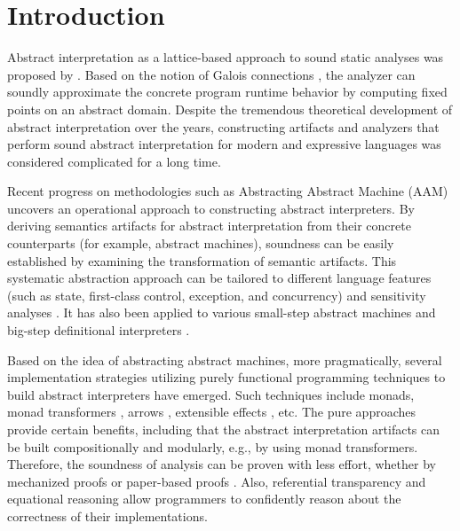 \section{Introduction} \label{intro}

Abstract interpretation as a lattice-based approach to sound static analyses was
proposed by \citet{DBLP:conf/popl/CousotC77}. Based on the notion of Galois
connections \cite{CousotCousot79-1}, the analyzer can soundly approximate the
concrete program runtime behavior by computing fixed points on an abstract
domain. Despite the tremendous theoretical development of abstract
interpretation over the years, constructing artifacts and analyzers that perform
sound abstract interpretation for modern and expressive languages was considered
complicated for a long time.

Recent progress on methodologies such as Abstracting Abstract Machine (AAM)
\cite{DBLP:journals/jfp/HornM12, DBLP:conf/icfp/HornM10} uncovers an
operational approach to constructing abstract interpreters.  By deriving
semantics artifacts for abstract interpretation from their concrete
counterparts (for example, abstract machines), soundness can be easily
established by examining the transformation of semantic artifacts.
This systematic abstraction approach can be tailored to different
language features (such as state, first-class control, exception, and
concurrency) and sensitivity analyses \cite{DBLP:conf/icfp/Gilray0M16,
  DBLP:conf/popl/GilrayL0MH16, Darais:2015:GTM:2814270.2814308}. It
has also been applied to various small-step abstract machines
\cite{DBLP:journals/jfp/HornM12, DBLP:conf/icfp/HornM10,
  Sergey:2013:MAI:2491956.2491979} and big-step definitional
interpreters \cite{Wei:2018:RAA:3243631.3236800,
  DBLP:journals/pacmpl/DaraisLNH17, Keidel:2018:CSP:3243631.3236767}.

Based on the idea of abstracting abstract machines, more
pragmatically, several implementation strategies utilizing purely
functional programming techniques to build abstract interpreters have
emerged. Such techniques include monads, monad transformers
\cite{DBLP:journals/pacmpl/DaraisLNH17,
  Sergey:2013:MAI:2491956.2491979}, arrows
\cite{Keidel:2018:CSP:3243631.3236767}, extensible effects
\cite{Kiselyov:2015:FMM:2804302.2804319, Githubsemantic}, etc. The pure
approaches provide certain benefits, including that the abstract interpretation
artifacts can be built compositionally and modularly, e.g., by using monad
transformers. Therefore, the soundness of analysis can be proven with less
effort, whether by mechanized proofs \cite{Darais:2016:CGC:2951913.2951934} or
paper-based proofs \cite{Keidel:2018:CSP:3243631.3236767}.  Also, referential
transparency and equational reasoning allow programmers to confidently reason
about the correctness of their implementations.

